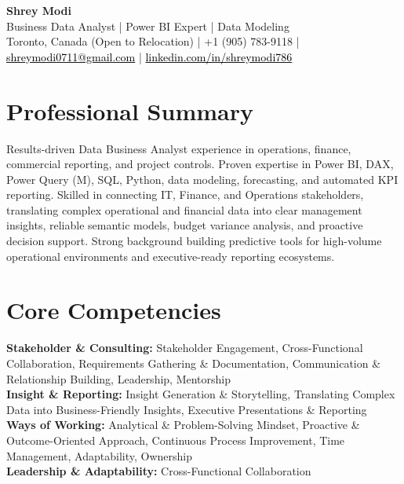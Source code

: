 \documentclass[10.5pt,letterpaper]{article}
\begin{document}
\begin{center}
  {\Huge \bfseries \color{accent} Shrey Modi}\\[0.3em]
  {\normalsize Business Data Analyst | Power BI Expert | Data Modeling}\\[0.1em]
  {\small Toronto, Canada (Open to Relocation) | +1 (905) 783-9118 | \href{mailto:shreymodi0711@gmail.com}{\textcolor{black}{shreymodi0711@gmail.com}} | \href{https://linkedin.com/in/shreymodi786}{\textcolor{black}{linkedin.com/in/shreymodi786}}}
\end{center}
\vspace{-12pt}

\section{Professional Summary}
\noindent Results-driven Data Business Analyst experience in operations, finance, commercial reporting, and project controls. Proven expertise in Power BI, DAX, Power Query (M), SQL, Python, data modeling, forecasting, and automated KPI reporting. Skilled in connecting IT, Finance, and Operations stakeholders, translating complex operational and financial data into clear management insights, reliable semantic models, budget variance analysis, and proactive decision support. Strong background building predictive tools for high-volume operational environments and executive-ready reporting ecosystems.

\section{Core Competencies}
\noindent
\textbf{Stakeholder \& Consulting:} Stakeholder Engagement, Cross-Functional Collaboration, Requirements Gathering \& Documentation, Communication \& Relationship Building, Leadership, Mentorship\\\textbf{Insight \& Reporting:} Insight Generation \& Storytelling, Translating Complex Data into Business-Friendly Insights, Executive Presentations \& Reporting\\\textbf{Ways of Working:} Analytical \& Problem-Solving Mindset, Proactive \& Outcome-Oriented Approach, Continuous Process Improvement, Time Management, Adaptability, Ownership\\\textbf{Leadership \& Adaptability:} Cross-Functional Collaboration
\end{document}
